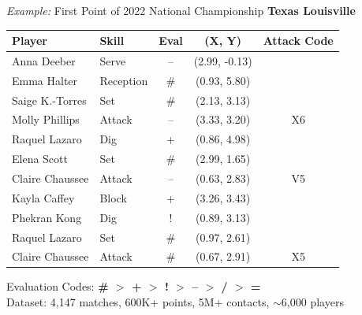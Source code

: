 \documentclass[handout]{beamer}
\begin{document}
\begin{frame}{{\it Example:} First Point of 2022 National Championship}{\bf \color{orange} Texas \color{red} Louisville}
  \begin{center}
    \small
    \begin{tabular}{llccc}
      \bf Player                      & \bf Skill                 & \bf Eval          & \bf (X, Y)                  & \bf Attack Code\\
      \hline
      \color{red} Anna Deeber         & \color{red} Serve         & \color{red} --    & \color{red} (2.99, -0.13)\\
      \color{orange} Emma Halter      & \color{orange} Reception  & \color{orange} \# & \color{orange} (0.93, 5.80)\\
      \color{orange} Saige K.-Torres  & \color{orange} Set        & \color{orange} \# & \color{orange} (2.13, 3.13)\\
      \color{orange} Molly Phillips   & \color{orange} Attack     & \color{orange} -- & \color{orange} (3.33, 3.20) & \color{orange} X6\\
      \color{red} Raquel Lazaro       & \color{red} Dig           & \color{red} +     & \color{red} (0.86, 4.98)\\
      \color{red} Elena Scott         & \color{red} Set           & \color{red} \#    & \color{red} (2.99, 1.65)\\
      \color{red} Claire Chaussee     & \color{red} Attack        & \color{red} --    & \color{red} (0.63, 2.83)    & \color{red} V5\\
      \color{orange} Kayla Caffey     & \color{orange} Block      & \color{orange} +  & \color{orange} (3.26, 3.43)\\
      \color{red} Phekran Kong        & \color{red} Dig           & \color{red} !     & \color{red} (0.89, 3.13)\\
      \color{red} Raquel Lazaro       & \color{red} Set           & \color{red} \#    & \color{red} (0.97, 2.61)\\
      \color{red} Claire Chaussee     & \color{red} Attack        & \color{red} \#    & \color{red} (0.67, 2.91)    & \color{red} X5
    \end{tabular}
  \end{center}
  \small
  Evaluation Codes: {\bf \# $>$ + $>$ ! $>$ -- $>$ / $>$ =}\\
  Dataset: 4,147 matches, 600K+ points, 5M+ contacts, $\sim$6,000 players
\end{frame}
\end{document}
